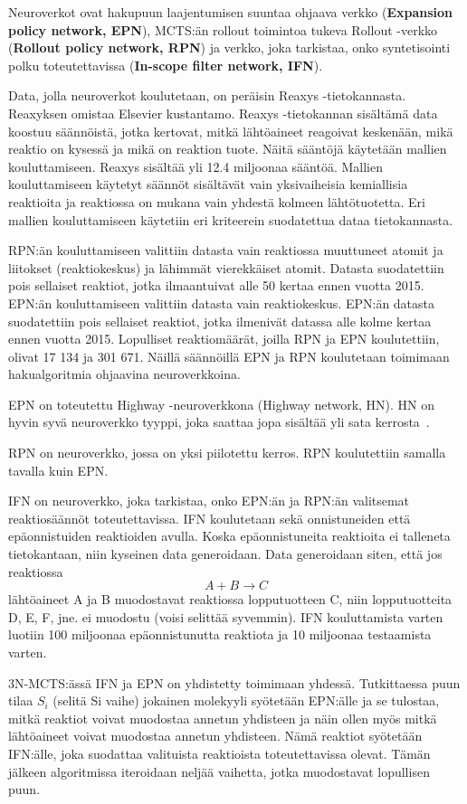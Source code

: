 \documentclass[finnish,twoside,censored,tkt,sw-line]{HYthesisML}
\begin{document}
Neuroverkot ovat hakupuun laajentumisen suuntaa ohjaava verkko (\textbf{Expansion policy network, EPN}),
MCTS:än rollout toimintoa tukeva Rollout -verkko (\textbf{Rollout policy network, RPN})
ja verkko, joka tarkistaa, onko syntetisointi polku toteutettavissa (\textbf{In-scope filter network, IFN}).

Data, jolla neuroverkot koulutetaan, on peräisin Reaxys -tietokannasta. Reaxyksen omistaa Elsevier kustantamo. Reaxys -tietokannan sisältämä data koostuu
säännöistä, jotka kertovat, mitkä lähtöaineet reagoivat keskenään, mikä reaktio on kysessä ja mikä on reaktion
tuote. Näitä sääntöjä käytetään mallien kouluttamiseen. Reaxys sisältää yli 12.4 miljoonaa sääntöä. Mallien
kouluttamiseen käytetyt säännöt sisältävät vain yksivaiheisia kemiallisia reaktioita ja reaktiossa on mukana vain
yhdestä kolmeen lähtötuotetta. Eri mallien kouluttamiseen käytetiin eri kriteerein suodatettua dataa tietokannasta.

RPN:än kouluttamiseen valittiin datasta vain reaktiossa muuttuneet atomit ja liitokset (reaktiokeskus)
ja lähimmät vierekkäiset atomit. Datasta suodatettiin pois sellaiset reaktiot, jotka ilmaantuivat
alle 50 kertaa ennen vuotta 2015. EPN:än kouluttamiseen valittiin datasta vain reaktiokeskus.
EPN:än datasta suodatettiin pois sellaiset reaktiot, jotka ilmenivät datassa alle kolme kertaa ennen vuotta
2015. Lopulliset reaktiomäärät, joilla RPN ja EPN koulutettiin, olivat 17 134 ja 301 671. Näillä säännöillä
EPN ja RPN koulutetaan toimimaan hakualgoritmia ohjaavina neuroverkkoina.

EPN on toteutettu Highway -neuroverkkona (Highway network, HN). HN on hyvin syvä neuroverkko
tyyppi, joka saattaa jopa sisältää yli sata kerrosta~\cite{VeryDeepNetworks}.

RPN on neuroverkko, jossa on yksi piilotettu kerros. RPN koulutettiin samalla tavalla kuin EPN.

IFN on neuroverkko, joka tarkistaa, onko EPN:än ja RPN:än valitsemat reaktiosäännöt toteutettavissa.
IFN koulutetaan sekä onnistuneiden että epäonnistuiden reaktioiden avulla. Koska epäonnistuneita
reaktioita ei talleneta tietokantaan, niin kyseinen data generoidaan. Data generoidaan siten, että jos reaktiossa
\[A + B \rightarrow C\] lähtöaineet A ja B muodostavat reaktiossa lopputuotteen C, niin lopputuotteita
D, E, F, jne. ei muodostu (voisi selittää syvemmin). IFN kouluttamista varten luotiin 100 miljoonaa
epäonnistunutta reaktiota ja 10 miljoonaa testaamista varten.

3N-MCTS:ässä IFN ja EPN on yhdistetty toimimaan yhdessä. Tutkittaessa puun tilaa $S_i$ (selitä Si vaihe) jokainen
molekyyli syötetään EPN:älle ja se tulostaa, mitkä reaktiot voivat muodostaa annetun yhdisteen ja näin ollen
myös mitkä lähtöaineet voivat muodostaa annetun yhdisteen. Nämä reaktiot syötetään IFN:älle, joka suodattaa
valituista reaktioista toteutettavissa olevat. Tämän jälkeen algoritmissa iteroidaan neljää vaihetta, jotka
muodostavat lopullisen puun.
\end{document}
